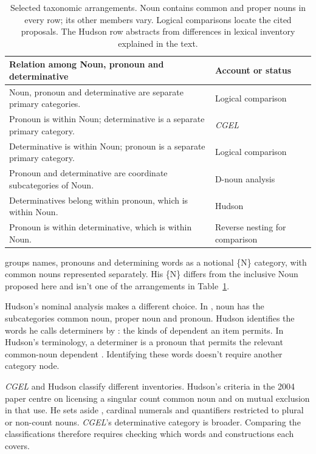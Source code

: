 \documentclass[12pt]{article}
\begin{document}
\begin{table}[tb]
\centering\small
\caption{Selected taxonomic arrangements. Noun contains common and proper nouns in every row; its other members vary. Logical comparisons locate the cited proposals. The Hudson row abstracts from differences in lexical inventory explained in the text.}\label{tab:rivals}
\begin{tabular}{>{\raggedright\arraybackslash}p{8.7cm}>{\raggedright\arraybackslash}p{3cm}}
\toprule
Relation among Noun, pronoun and determinative & Account or status \\
\midrule
Noun, pronoun and determinative are separate primary categories. & Logical comparison \\
Pronoun is within Noun; determinative is a separate primary category. & \textit{CGEL} \\
Determinative is within Noun; pronoun is a separate primary category. & Logical comparison \\
Pronoun and determinative are coordinate subcategories of Noun. & D-noun analysis \\
Determinatives belong within pronoun, which is within Noun. & Hudson \\
Pronoun is within determinative, which is within Noun. & Reverse nesting for comparison \\
\bottomrule
\end{tabular}
\end{table}

\textcite{anderson1997notional} groups names, pronouns and determining words as a notional \{N\} category, with common nouns represented separately. His \{N\} differs from the inclusive Noun proposed here and isn't one of the arrangements in Table~\ref{tab:rivals}.

Hudson's nominal analysis makes a different choice. In \textcite[253--254]{hudson2010wordgrammar}, noun has the subcategories common noun, proper noun and pronoun. Hudson identifies the words he calls determiners by : the kinds of dependent an item permits. In Hudson's terminology, a determiner is a pronoun that permits the relevant common-noun dependent \citep[9--10]{hudson2004determiners}. Identifying these words doesn't require another category node.

\textit{CGEL} and Hudson classify different inventories. Hudson's criteria in the 2004 paper centre on licensing a singular count common noun and on mutual exclusion in that use. He sets aside , cardinal numerals and quantifiers restricted to plural or non-count nouns. \textit{CGEL}'s determinative category is broader. Comparing the classifications therefore requires checking which words and constructions each covers.
\end{document}
